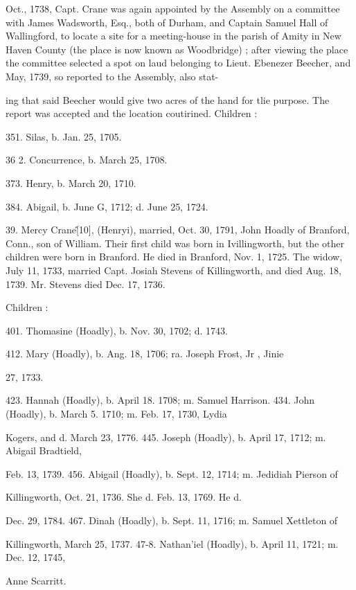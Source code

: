 Oct., 1738, Capt. Crane was again appointed by the Assembly 
on a committee with James Wadsworth, Esq., both of Durham, 
and Captain Samuel Hall of Wallingford, to locate a site for a 
meeting-house in the parish of Amity in New Haven County (the 
place is now known as Woodbridge) ; after viewing the place the 
committee selected a spot on laud belonging to Lieut. Ebenezer 
Beecher, and May, 1739, so reported to the Assembly, also stat- 




ing that said Beecher would give two acres of the hand for tlie 
purpose. The report was accepted and the location coutirined. 
Children : 

351. Silas, b. Jan. 25, 1705. 

36  2. Concurrence, b. March 25, 1708. 

373. Henry, b. March 20, 1710. 

384. Abigail, b. June G, 1712; d. June 25, 1724. 

39. Mercy Crane\^ [10], (Henryi), married, Oct. 30, 1791, 
John Hoadly of Branford, Conn., son of William. Their first 
child was born in Ivillingworth, but the other children were born 
in Branford. He died in Branford, Nov. 1, 1725. The widow, 
July 11, 1733, married Capt. Josiah Stevens of Killingworth, and 
died Aug. 18, 1739. Mr. Stevens died Dec. 17, 1736. 

Children : 

401. Thomasine (Hoadly), b. Nov. 30, 1702; d. 1743. 

412. Mary (Hoadly), b. Ang. 18, 1706; ra. Joseph Frost, Jr , Jinie 

27, 1733.  

423. Hannah (Hoadly), b. April 18. 1708; m. Samuel Harrison. 
434. John (Hoadly), b. March 5. 1710; m. Feb. 17, 1730, Lydia 

Kogers, and d. March 23, 1776. 
445. Joseph (Hoadly), b. April 17, 1712; m. Abigail Bradtield, 

Feb. 13, 1739. 
456. Abigail (Hoadly), b. Sept. 12, 1714; m. Jedidiah Pierson of 

Killingworth, Oct. 21, 1736. She d. Feb. 13, 1769. He d. 

Dec. 29, 1784. 
467. Dinah (Hoadly), b. Sept. 11, 1716; m. Samuel Xettleton of 

Killingworth, March 25, 1737. 
47-8. Nathan'iel (Hoadly), b. April 11, 1721; m. Dec. 12, 1745, 

Anne Scarritt. 



